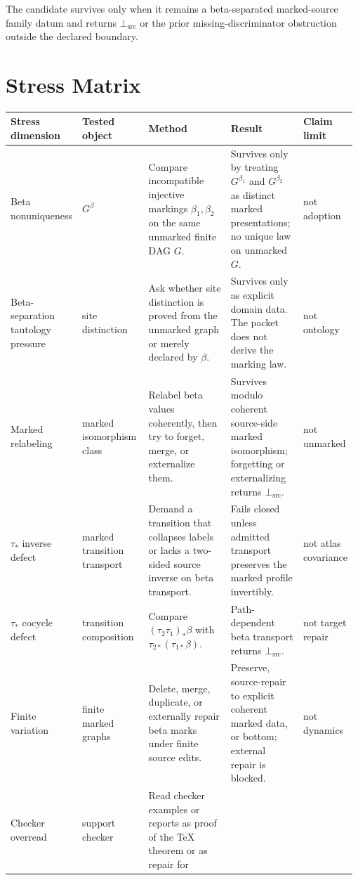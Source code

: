 \documentclass[11pt]{article}
\newcommand{\BottomSrc}{\bot_{\mathrm{src}}}
\begin{document}
The candidate survives only when it remains a beta-separated marked-source
family datum and returns \(\BottomSrc\) or the prior missing-discriminator
obstruction outside the declared boundary.

\section{Stress Matrix}

\begin{longtable}{p{0.16\linewidth}p{0.20\linewidth}p{0.30\linewidth}p{0.22\linewidth}p{0.10\linewidth}}
\toprule
Stress dimension & Tested object & Method & Result & Claim limit \\
\midrule
Beta nonuniqueness &
\(G^\beta\) &
Compare incompatible injective markings \(\beta_1,\beta_2\) on the same
unmarked finite DAG \(G\). &
Survives only by treating \(G^{\beta_1}\) and \(G^{\beta_2}\) as distinct
marked presentations; no unique law on unmarked \(G\). &
not adoption \\
Beta-separation tautology pressure &
site distinction &
Ask whether site distinction is proved from the unmarked graph or merely
declared by \(\beta\). &
Survives only as explicit domain data. The packet does not derive the marking
law. &
not ontology \\
Marked relabeling &
marked isomorphism class &
Relabel beta values coherently, then try to forget, merge, or externalize
them. &
Survives modulo coherent source-side marked isomorphism; forgetting or
externalizing returns \(\BottomSrc\). &
not unmarked \\
\(\tau_\ast\) inverse defect &
marked transition transport &
Demand a transition that collapses labels or lacks a two-sided source inverse
on beta transport. &
Fails closed unless admitted transport preserves the marked profile
invertibly. &
not atlas covariance \\
\(\tau_\ast\) cocycle defect &
transition composition &
Compare \((\tau_2\tau_1)_\ast\beta\) with
\(\tau_{2\ast}(\tau_{1\ast}\beta)\). &
Path-dependent beta transport returns \(\BottomSrc\). &
not target repair \\
Finite variation &
finite marked graphs &
Delete, merge, duplicate, or externally repair beta marks under finite source
edits. &
Preserve, source-repair to explicit coherent marked data, or bottom; external
repair is blocked. &
not dynamics \\
Checker overread &
support checker &
Read checker examples or reports as proof of the TeX theorem or as repair for

\end{longtable}
\end{document}
